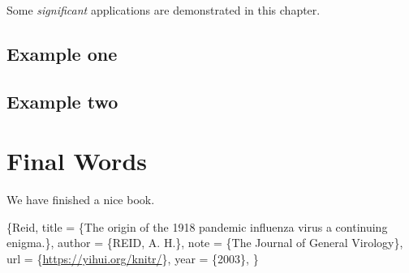 \documentclass[]{book}
\begin{document}
Some \emph{significant} applications are demonstrated in this chapter.

\hypertarget{example-one}{%
\section{Example one}\label{example-one}}

\hypertarget{example-two}{%
\section{Example two}\label{example-two}}

\hypertarget{final-words}{%
\chapter{Final Words}\label{final-words}}

We have finished a nice book.

\citet{Reid} \{Reid,
title = \{The origin of the 1918 pandemic influenza virus a
continuing enigma.\},
author = \{REID, A. H.\},
note = \{The Journal of General Virology\},
url = \{\url{https://yihui.org/knitr/}\},
year = \{2003\},
\}


\end{document}
